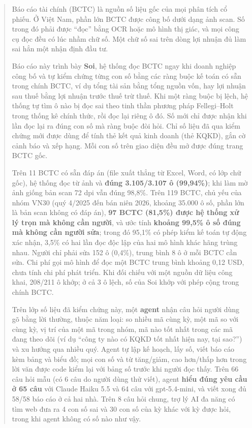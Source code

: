 \documentclass[12pt,a4paper]{report}
\newcommand{\enquote}[1]{“#1”}
\begin{document}
\begin{abstract}
Báo cáo tài chính (BCTC) là nguồn số liệu gốc của mọi phân tích cổ phiếu. Ở Việt Nam, phần lớn BCTC được công bố dưới
dạng ảnh scan. Số trong đó phải được \enquote{đọc} bằng OCR hoặc mô hình thị giác, và mọi công cụ đọc đều có lúc nhầm chữ
số. Một chữ số sai trên dòng lợi nhuận đủ làm sai hẳn một nhận định đầu tư.

Báo cáo này trình bày \textbf{Soi}, hệ thống đọc BCTC ngay khi doanh nghiệp công bố và tự kiểm chứng từng con số bằng
các ràng buộc kế toán có sẵn trong chính BCTC, ví dụ tổng tài sản bằng tổng nguồn vốn, hay lợi nhuận sau thuế bằng lợi
nhuận trước thuế trừ thuế. Khi một ràng buộc bị lệch, hệ thống tự tìm ô nào bị đọc sai theo tinh thần phương pháp
Fellegi--Holt trong thống kê chính thức, rồi đọc lại riêng ô đó. Số mới chỉ được nhận khi lần đọc lại ra đúng con số mà
ràng buộc đòi hỏi. Chỉ số liệu đã qua kiểm chứng mới được dùng để tính thẻ kết quả kinh doanh (thẻ KQKD), gắn cờ cảnh
báo và xếp hạng. Mỗi con số trên giao diện đều mở được đúng trang BCTC gốc.

Trên 11 BCTC có sẵn đáp án (file xuất thẳng từ Excel, Word, có lớp chữ gốc), hệ thống đọc từ ảnh và \textbf{đúng
3.105/3.107 ô (99,94\%)}; khi làm mờ ảnh giống bản scan 72 dpi vẫn đúng 98,8\%. Trên 119 BCTC, chủ yếu của nhóm VN30 (quý
4/2025 đến bán niên 2026, khoảng 35.000 ô số, phần lớn là bản scan không có đáp án), \textbf{97 BCTC (81,5\%) được hệ thống
xử lý trọn mà không cần người}, và ước tính \textbf{khoảng 99,5\% ô số đúng mà không cần người sửa}; trong đó 95,1\% có
phép kiểm kế toán tự động xác nhận, 3,5\% có hai lần đọc độc lập của hai mô hình khác hãng trùng nhau. Người chỉ phải
sửa 152 ô (0,4\%), trung bình 8 ô ở mỗi BCTC cần sửa. Chi phí gọi mô hình để đọc một BCTC trung bình
khoảng 0,12 USD, chưa tính chi phí phát triển. Khi đối chiếu với một nguồn dữ liệu công khai, 208/211 ô khớp; ở cả 3 ô lệch, số của Soi khớp với phép cộng
trong chính BCTC.

Trên lớp số liệu đã kiểm chứng này, một \textbf{agent} nhận câu hỏi người dùng gõ bằng lời thường, thuộc năm loại: so
nhiều mã cùng kỳ, một mã so với cùng kỳ, vị trí của một mã trong nhóm, mã nào tốt nhất trong các mã đang theo dõi (ví
dụ \enquote{công ty nào có KQKD tốt nhất hiện nay, tại sao?}) và xu hướng qua nhiều quý. Agent tự lập kế hoạch, lấy số, viết báo cáo kèm bảng và
biểu đồ; mọi con số và từ tăng/giảm, cao hơn/thấp hơn trong lời văn được code kiểm lại với bảng số trước khi người đọc
thấy. Trên 66 câu hỏi mẫu (có 6 câu do người dùng thử viết), agent \textbf{hiểu đúng yêu cầu ở 65 câu} với Claude Haiku
5.5 và 64 câu với gpt-5.4-mini, và viết xong đủ 58/58 báo cáo ở cả hai nhà. Trên 8 câu hỏi chung, trợ lý AI đa năng có tìm
web đưa ra 4 con số sai và 30 con số của kỳ khác với kỳ được hỏi, trong khi agent không có số nào như vậy.
\end{abstract}
\end{document}
